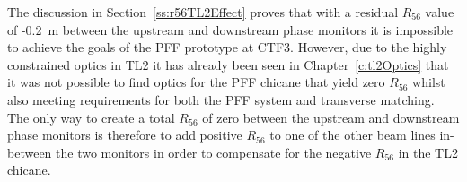 







The discussion in Section~\ref{ss:r56TL2Effect} proves that with a residual \(R_{56}\) value of -0.2~m between the upstream and downstream phase monitors it is impossible to achieve the goals of the PFF prototype at CTF3. However, due to the highly constrained optics in TL2 it has already been seen in Chapter~\ref{c:tl2Optics} that it was not possible to find optics for the PFF chicane that yield zero \(R_{56}\) whilst also meeting requirements for both the PFF system and transverse matching. The only way to create a total \(R_{56}\) of zero between the upstream and downstream phase monitors is therefore to add positive \(R_{56}\) to one of the other beam lines in-between the two monitors in order to compensate for the negative \(R_{56}\) in the TL2 chicane. 

